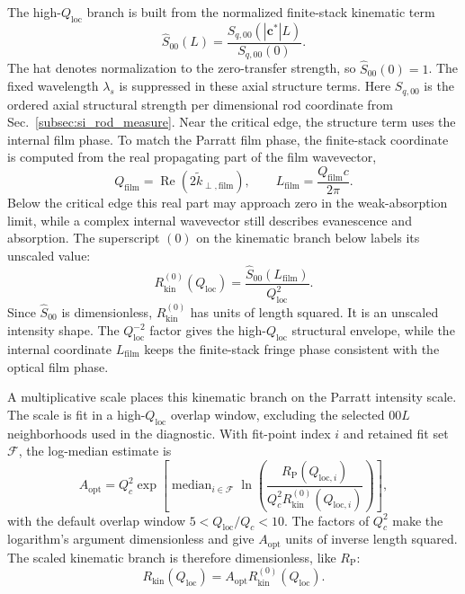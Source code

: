 The high-$Q_{\mathrm{loc}}$ branch is built from the normalized finite-stack kinematic term
\begin{equation}
  \widehat S_{00}(L)=
  \frac{S_{q,00}(|\mathbf c^*|L)}{S_{q,00}(0)}.
  \label{eq:si_ht_normalized_structure}
\end{equation}
The hat denotes normalization to the zero-transfer strength, so $\widehat S_{00}(0)=1$. The fixed wavelength $\lambda_s$ is suppressed in these axial structure terms. Here $S_{q,00}$ is the ordered axial structural strength per dimensional rod coordinate from Sec.~\ref{subsec:si_rod_measure}. Near the critical edge, the structure term uses the internal film phase. To match the Parratt film phase, the finite-stack coordinate is computed from the real propagating part of the film wavevector,
\begin{equation}
  Q_{\mathrm{film}}=\operatorname{Re}\!\left(2\widetilde k_{\perp,\mathrm{film}}\right),
  \qquad
  L_{\mathrm{film}}=\frac{Q_{\mathrm{film}}c}{2\pi}.
  \label{eq:si_internal_phase_coordinate}
\end{equation}
Below the critical edge this real part may approach zero in the weak-absorption
limit, while a complex internal wavevector still describes evanescence and
absorption. The superscript $(0)$ on the kinematic branch below labels its unscaled value:
\begin{equation}
  R_{\mathrm{kin}}^{(0)}(Q_{\mathrm{loc}})=\frac{\widehat S_{00}(L_{\mathrm{film}})}{Q_{\mathrm{loc}}^2}.
  \label{eq:si_crossover_unscaled_structure}
\end{equation}
Since $\widehat S_{00}$ is dimensionless, $R_{\mathrm{kin}}^{(0)}$ has units of length squared. It is an unscaled intensity shape. The $Q_{\mathrm{loc}}^{-2}$ factor gives the high-$Q_{\mathrm{loc}}$ structural envelope, while the
internal coordinate $L_{\mathrm{film}}$ keeps the finite-stack fringe phase consistent with
the optical film phase.

A multiplicative scale places this kinematic branch on the Parratt intensity
scale. The scale is fit in a high-$Q_{\mathrm{loc}}$ overlap window, excluding the selected
$00L$ neighborhoods used in the diagnostic. With fit-point index $i$ and retained fit set $\mathcal F$, the
log-median estimate is
\begin{equation}
  A_{\mathrm{opt}}=Q_c^2
  \exp\!\left[
  \operatorname{median}_{i\in\mathcal F}
  \ln\!\left(
  \frac{R_{\mathrm P}(Q_{\mathrm{loc},i})}
       {Q_c^2R_{\mathrm{kin}}^{(0)}(Q_{\mathrm{loc},i})}
  \right)
  \right],
  \label{eq:si_crossover_scale}
\end{equation}
with the default overlap window $5<Q_{\mathrm{loc}}/Q_c<10$. The factors of $Q_c^2$ make the logarithm's argument dimensionless and give $A_{\mathrm{opt}}$ units of inverse length squared. The scaled kinematic branch is therefore dimensionless, like $R_{\mathrm P}$:
\begin{equation}
  R_{\mathrm{kin}}(Q_{\mathrm{loc}})=A_{\mathrm{opt}} R_{\mathrm{kin}}^{(0)}(Q_{\mathrm{loc}}).
  \label{eq:si_crossover_scaled_structure}
\end{equation}


